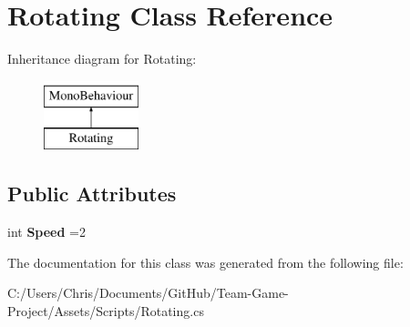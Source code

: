 \hypertarget{class_rotating}{}\section{Rotating Class Reference}
\label{class_rotating}
Inheritance diagram for Rotating\+:\begin{figure}[H]
\begin{center}
\leavevmode
\includegraphics[height=2.000000cm]{class_rotating}
\end{center}
\end{figure}
\subsection*{Public Attributes}
\begin{DoxyCompactItemize}
\item 
int {\bfseries Speed} =2\hypertarget{class_rotating_a6457c77fff2d0c1cc6441dd63579345c}{}\label{class_rotating_a6457c77fff2d0c1cc6441dd63579345c}

\end{DoxyCompactItemize}


The documentation for this class was generated from the following file\+:\begin{DoxyCompactItemize}
\item 
C\+:/\+Users/\+Chris/\+Documents/\+Git\+Hub/\+Team-\/\+Game-\/\+Project/\+Assets/\+Scripts/Rotating.\+cs\end{DoxyCompactItemize}
